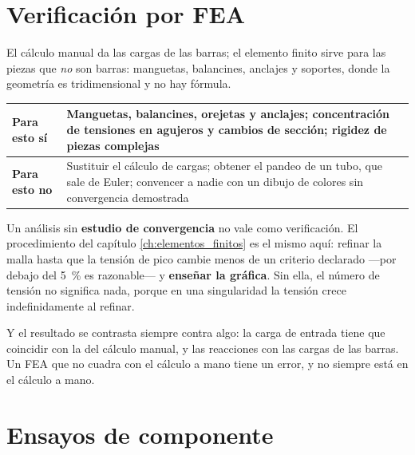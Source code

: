 \section{Verificación por FEA}
\label{sec:casos_carga:04}

El cálculo manual da las cargas de las barras; el elemento finito sirve para las
piezas que \emph{no} son barras: manguetas, balancines, anclajes y soportes,
donde la geometría es tridimensional y no hay fórmula.

\begin{center}
\begin{tabularx}{\textwidth}{@{}lX@{}}
\toprule
\textbf{Para esto sí} & Manguetas, balancines, orejetas y anclajes; concentración
  de tensiones en agujeros y cambios de sección; rigidez de piezas complejas \\
\midrule
\textbf{Para esto no} & Sustituir el cálculo de cargas; obtener el pandeo de un
  tubo, que sale de Euler; convencer a nadie con un dibujo de colores sin
  convergencia demostrada \\
\bottomrule
\end{tabularx}
\end{center}

\begin{ojo}
Un análisis sin \textbf{estudio de convergencia} no vale como verificación. El
procedimiento del capítulo \ref{ch:elementos_finitos} es el mismo aquí: refinar
la malla hasta que la tensión de pico cambie menos de un criterio declarado
---por debajo del \SI{5}{\percent} es razonable--- y \textbf{enseñar la gráfica}.
Sin ella, el número de tensión no significa nada, porque en una singularidad la
tensión crece indefinidamente al refinar.

Y el resultado se contrasta siempre contra algo: la carga de entrada tiene que
coincidir con la del cálculo manual, y las reacciones con las cargas de las
barras. Un FEA que no cuadra con el cálculo a mano tiene un error, y no siempre
está en el cálculo a mano.
\end{ojo}

\section{Ensayos de componente}
\label{sec:casos_carga:05}

